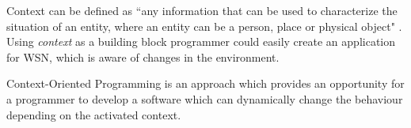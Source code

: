 \documentclass{ubicomp-ext}
\begin{document}

Context can be defined as ``any information that can be used to characterize the situation of an entity, where an entity can be a person, place or physical object" \cite{dey99}. Using \textit{context} as a building block programmer could easily create an application for WSN, which is aware of changes in the environment.

Context-Oriented Programming \cite{hirschfeld08} is an approach which provides an opportunity for a programmer to develop a software which can dynamically change the behaviour depending on the activated context.
\end{document}
